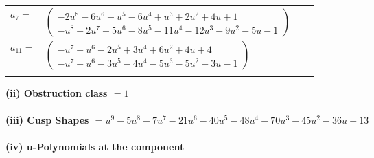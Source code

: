 \documentclass[1p]{elsarticle_modified}
\theoremstyle{definition}
\begin{document}
\begin{tabular}{m{7pt} m{180pt} m{7pt} m{180pt} }
\flushright $a_{7}=$&$\begin{pmatrix}-2 u^8-6 u^6- u^5-6 u^4+u^3+2 u^2+4 u+1\\- u^8-2 u^7-5 u^6-8 u^5-11 u^4-12 u^3-9 u^2-5 u-1\end{pmatrix}$ \\
\flushright $a_{11}=$&$\begin{pmatrix}- u^7+u^6-2 u^5+3 u^4+6 u^2+4 u+4\\- u^7- u^6-3 u^5-4 u^4-5 u^3-5 u^2-3 u-1\end{pmatrix}$\\&\end{tabular}
\flushleft \textbf{(ii) Obstruction class $= 1$}\\~\\
\flushleft \textbf{(iii) Cusp Shapes $= u^9-5 u^8-7 u^7-21 u^6-40 u^5-48 u^4-70 u^3-45 u^2-36 u-13$}\\~\\
\newpage\renewcommand{\arraystretch}{1}
\flushleft \textbf{(iv) u-Polynomials at the component}\newline \\
\end{document}

